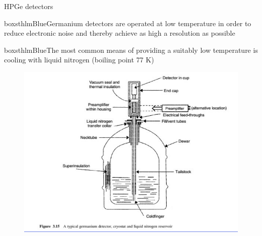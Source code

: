 \begin{frame}[allowframebreaks]{HPGe detectors}

\begin{beamercolorbox}[wd=\linewidth,ht=10ex,dp=3ex]{boxsthlmBlue}\centering Germanium detectors are operated at low temperature in order to reduce electronic noise and thereby achieve as high a resolution as possible\end{beamercolorbox}

\centering \arrowdown

\begin{beamercolorbox}[wd=\linewidth,ht=6ex,dp=3ex]{boxsthlmBlue}\centering The most common means of providing a suitably low temperature is cooling with liquid nitrogen (boiling point 77 K)\end{beamercolorbox}


\begin{figure}
\includegraphics[scale=0.4]{figures/schemehpge.png}
\end{figure}

\end{frame}

